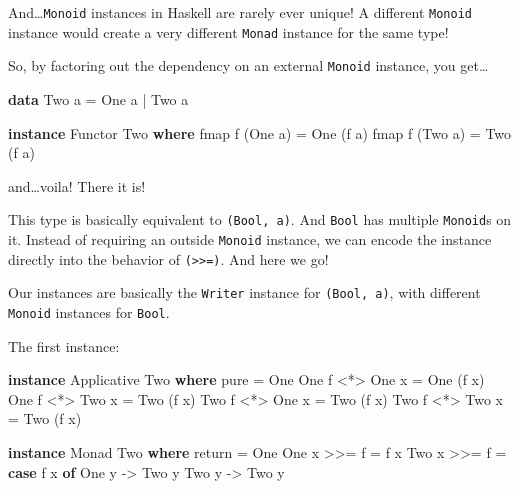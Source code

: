 \documentclass[]{article}
\newenvironment{Shaded}{}{}
\newcommand{\KeywordTok}[1]{\textcolor[rgb]{0.00,0.44,0.13}{\textbf{{#1}}}}
\newcommand{\DataTypeTok}[1]{\textcolor[rgb]{0.56,0.13,0.00}{{#1}}}
\newcommand{\OtherTok}[1]{\textcolor[rgb]{0.00,0.44,0.13}{{#1}}}
\newcommand{\FunctionTok}[1]{\textcolor[rgb]{0.02,0.16,0.49}{{#1}}}
\newcommand{\NormalTok}[1]{{#1}}
\begin{document}
And\ldots{}\texttt{Monoid} instances in Haskell are rarely ever unique! A
different \texttt{Monoid} instance would create a very different \texttt{Monad}
instance for the same type!

So, by factoring out the dependency on an external \texttt{Monoid} instance, you
get\ldots{}

\begin{Shaded}
\begin{Highlighting}[]
\KeywordTok{data} \DataTypeTok{Two} \NormalTok{a }\FunctionTok{=} \DataTypeTok{One} \NormalTok{a }\FunctionTok{|} \DataTypeTok{Two} \NormalTok{a}

\KeywordTok{instance} \DataTypeTok{Functor} \DataTypeTok{Two} \KeywordTok{where}
    \NormalTok{fmap f (}\DataTypeTok{One} \NormalTok{a) }\FunctionTok{=} \DataTypeTok{One} \NormalTok{(f a)}
    \NormalTok{fmap f (}\DataTypeTok{Two} \NormalTok{a) }\FunctionTok{=} \DataTypeTok{Two} \NormalTok{(f a)}
\end{Highlighting}
\end{Shaded}

and\ldots{}voila! There it is!

This type is basically equivalent to \texttt{(Bool,\ a)}. And \texttt{Bool} has
multiple \texttt{Monoid}s on it. Instead of requiring an outside \texttt{Monoid}
instance, we can encode the instance directly into the behavior of
\texttt{(\textgreater{}\textgreater{}=)}. And here we go!

Our instances are basically the \texttt{Writer} instance for
\texttt{(Bool,\ a)}, with different \texttt{Monoid} instances for \texttt{Bool}.

The first instance:

\begin{Shaded}
\begin{Highlighting}[]
\KeywordTok{instance} \DataTypeTok{Applicative} \DataTypeTok{Two} \KeywordTok{where}
    \NormalTok{pure }\FunctionTok{=} \DataTypeTok{One}
    \DataTypeTok{One} \NormalTok{f }\FunctionTok{<*>} \DataTypeTok{One} \NormalTok{x }\FunctionTok{=} \DataTypeTok{One} \NormalTok{(f x)}
    \DataTypeTok{One} \NormalTok{f }\FunctionTok{<*>} \DataTypeTok{Two} \NormalTok{x }\FunctionTok{=} \DataTypeTok{Two} \NormalTok{(f x)}
    \DataTypeTok{Two} \NormalTok{f }\FunctionTok{<*>} \DataTypeTok{One} \NormalTok{x }\FunctionTok{=} \DataTypeTok{Two} \NormalTok{(f x)}
    \DataTypeTok{Two} \NormalTok{f }\FunctionTok{<*>} \DataTypeTok{Two} \NormalTok{x }\FunctionTok{=} \DataTypeTok{Two} \NormalTok{(f x)}

\KeywordTok{instance} \DataTypeTok{Monad} \DataTypeTok{Two} \KeywordTok{where}
    \NormalTok{return }\FunctionTok{=} \DataTypeTok{One}
    \DataTypeTok{One} \NormalTok{x }\FunctionTok{>>=} \NormalTok{f }\FunctionTok{=} \NormalTok{f x}
    \DataTypeTok{Two} \NormalTok{x }\FunctionTok{>>=} \NormalTok{f }\FunctionTok{=} \KeywordTok{case} \NormalTok{f x }\KeywordTok{of}
                    \DataTypeTok{One} \NormalTok{y }\OtherTok{->} \DataTypeTok{Two} \NormalTok{y}
                    \DataTypeTok{Two} \NormalTok{y }\OtherTok{->} \DataTypeTok{Two} \NormalTok{y}
\end{Highlighting}
\end{Shaded}
\end{document}
